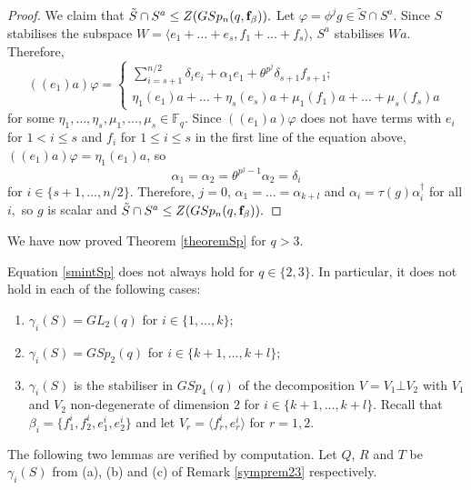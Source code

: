 \begin{proof}
We claim that $\tilde{S} \cap S^a \le Z(GSp_n(q,{\bf f}_{\beta})).$ Let $\varphi =\phi^j g \in \tilde{S} \cap S^a$.  Since $S$ stabilises the subspace $W=\langle e_1 + \ldots + e_{s}, f_1 + \ldots + f_{s}  \rangle$,  $S^a$ stabilises $W a.$  Therefore, 
\begin{equation*}
((e_1)a)\varphi=
\begin{cases}
 \sum_{i=s +1}^{n/2}  \delta_i e_i + \alpha_1 e_1 + \theta^{p^j} \delta_{s+1} f_{s+1};\\
\eta_1 (e_1)a+ \ldots +\eta_{s}(e_{s})a + \mu_1 (f_1)a+ \ldots +\mu_{s}(f_{s})a
\end{cases}
\end{equation*}
for some $\eta_1, \ldots, \eta_{s}, \mu_1, \ldots, \mu_{s}  \in \mathbb{F}_q.$
Since $((e_1)a)\varphi$ does not have terms with $e_i$ for $1<i  \le {s}$ and $f_i $ for $1 \le i \le {s}$ in the first line of the equation above, $((e_1 )a)\varphi = \eta_1 (e_1 )a$, so
$$\alpha_1=\alpha_2=\theta^{p^j-1}\alpha_2=\delta_{i}$$
for $i \in \{s+1, \ldots, n/2 \}.$
Therefore, $j=0$,  $\alpha_1= \ldots = \alpha_{k+l}$ and $\alpha_i=\tau(g)\alpha_i^{\dagger}$ for all $i,$ so $g$ is scalar  and $\tilde{S} \cap S^a \le Z(GSp_n(q,{\bf f}_{\beta})).$
\end{proof}

We have now proved Theorem \ref{theoremSp} for $q > 3.$



\begin{Rem} \label{symprem23} Equation \eqref{smintSp} does not always hold for 
$q \in \{2,3\}$. In particular, it does not hold in each of the following cases: 
\begin{enumerate}[label=(\alph*)]
\item $\gamma_i(S)=GL_2(q)$ for $i \in \{1, \ldots, k\};$ \label{q23gl2}
\item $\gamma_i(S)=GSp_2(q)$ for $i \in \{k+1, \ldots, k+l\};$ \label{q23gsp2}
\item $\gamma_i(S)$ is the stabiliser in $GSp_4(q)$ of the decomposition $V=V_1 \bot V_2$ with $V_1$ and $V_2$ non-degenerate of dimension $2$  for $i \in \{k+1, \ldots, k+l\}.$ Recall that $\beta_i=\{f_1^i,f_2^i,e_1^i,e_2^i\}$ and let $V_r= \langle f_r^i, e_r^i \rangle$ for $r=1,2.$ \label{q23sp2wr2}
\end{enumerate}
\end{Rem}

The following two lemmas  are verified by computation. Let $Q$, $R$ and $T$ be $\gamma_i(S)$   from (a), (b) and (c) of Remark \ref{symprem23} respectively.

